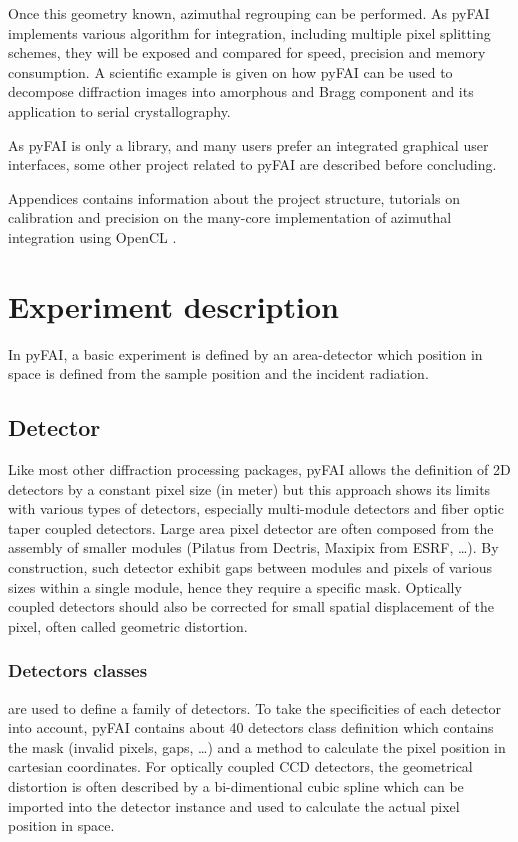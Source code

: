 \documentclass[preprint]{iucr}
\begin{document}
Once this geometry known, azimuthal regrouping can be performed. 
As pyFAI implements various algorithm for integration, including 
multiple pixel splitting schemes, they will be exposed and compared
for speed, precision and memory consumption.
A scientific example is given on how pyFAI can be used to decompose 
diffraction images into amorphous and Bragg component and its application
to serial crystallography.

As pyFAI is only a library, and many users prefer an integrated graphical user
interfaces, some other project related to pyFAI are described before concluding.

Appendices contains information about the project structure, tutorials on
calibration and precision on the many-core implementation of azimuthal
integration using OpenCL \cite{opencl}.
 
\section{Experiment description}
In pyFAI, a basic experiment is defined by an area-detector which position in
space is defined from the sample position and the incident radiation.

\subsection{Detector}
Like most other diffraction processing packages, pyFAI allows the definition of
2D detectors by a constant pixel size (in meter) but this approach shows its limits
with various types of detectors, especially multi-module detectors and fiber
optic taper coupled detectors. Large area pixel detector are often composed from
the assembly of smaller modules (Pilatus from Dectris, Maxipix from ESRF, \ldots). 
By construction, such detector exhibit gaps between modules and pixels of
various sizes within a single module, hence they require a specific mask.
Optically coupled detectors should also be corrected
for small spatial displacement of the pixel, often called geometric distortion.

\subsubsection{Detectors classes} are used to define a family of detectors. 
To take the specificities of each detector into account, pyFAI contains about
40 detectors class definition\cite{Rayonix is acknowledged for the comprehensive
description of all their detectors} which contains the mask (invalid pixels,
gaps, \ldots) and a method to calculate the pixel position in cartesian coordinates.
For optically coupled CCD detectors, the geometrical distortion is often
described by a bi-dimentional cubic spline which can be imported into
the detector instance and used to calculate the actual pixel position in space.
\end{document}
